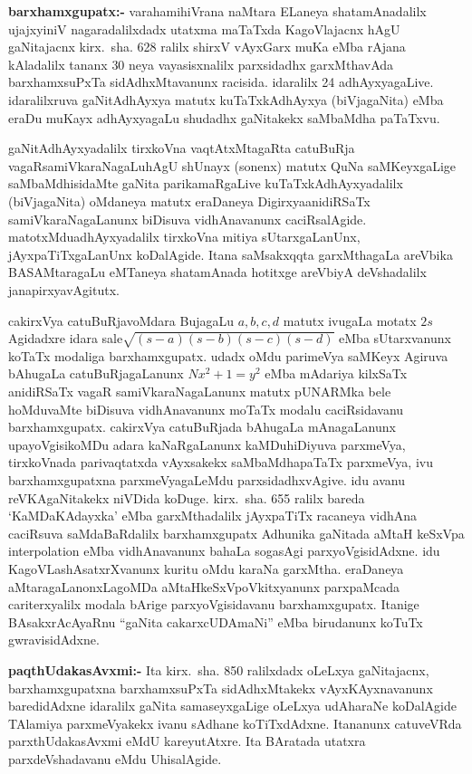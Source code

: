 \textbf{barxhamxgupatx:-} varahamihiVrana naMtara ELaneya shatamAnadalilx ujajxyiniV nagaradalilxdadx utatxma maTaTxda KagoVlajacnx hAgU gaNitajacnx kirx.~sha. {\rm 628} ralilx shirxV vAyxGarx muKa eMba rAjana kAladalilx tananx {\rm 30} neya vayasisxnalilx parxsidadhx garxMthavAda barxhamxsuPxTa sidAdhxMtavanunx racisida. idaralilx {\rm 24} adhAyxyagaLive. idaralilxruva gaNitAdhAyxya matutx kuTaTxkAdhAyxya (biVjagaNita) eMba eraDu muKayx adhAyxyagaLu shudadhx gaNitakekx saMbaMdha paTaTxvu.

gaNitAdhAyxyadalilx tirxkoVna vaqtAtxMtagaRta catuBuRja vagaRsamiVkaraNagaLu\break hAgU shUnayx (sonenx) matutx QuNa saMKeyxgaLige saMbaMdhisidaMte gaNita parikamaR\-gaLive kuTaTxkAdhAyxyadalilx (biVjagaNita) oMdaneya matutx eraDaneya Digirxya\break anidiRSaTx samiVkaraNagaLanunx biDisuva vidhAnavanunx caciRsalAgide. matotxMdu\break adhAyxyadalilx tirxkoVna mitiya sUtarxgaLanUnx, jAyxpaTiTxgaLanUnx koDalAgide. Itana saMsakxqqta garxMthagaLa areVbika BASAMtaragaLu eMTaneya shatamAnada hotitxge areVbiyA deVshadalilx janapirxyavAgitutx.

cakirxVya catuBuRjavoMdara BujagaLu $a, b, c, d$ matutx ivugaLa motatx $2s$  Agidadxre idara  sale$\sqrt{(s-a)(s-b)(s-c)(s-d)}$
eMba sUtarxvanunx koTaTx modaliga barxhamxgupatx. udadx oMdu parimeVya saMKeyx Agiruva bAhugaLa catuBuRjagaLanunx $Nx^{2}+1=y^{2}$ eMba mAdariya kilxSaTx anidiRSaTx vagaR samiVkaraNa\-gaLanunx matutx pUNARMka bele hoMduvaMte biDisuva vidhAnavanunx moTaTx modalu caciRsidavanu barxhamxgupatx. cakirxVya catuBuRjada bAhugaLa mAnagaLanunx upayoVgisikoMDu adara kaNaRgaLanunx kaMDuhiDiyuva parxmeVya, tirxkoVnada parivaqtatxda vAyxsakekx saMbaMdhapaTaTx parxmeVya, ivu barxhamxgupatxna parxmeVyagaLeMdu parxsidadhxvAgive. idu avanu reVKAgaNitakekx niVDida koDuge. kirx.~sha. {\rm 655} ralilx bareda `KaMDaKAdayxka' eMba garxMthadalilx jAyxpaTiTx racaneya vidhAna caciRsuva saMdaBaRdalilx barxhamxgupatx Adhunika gaNitada aMtaH keSxVpa {\rm interpolation} eMba vidhAnavanunx bahaLa sogasAgi parxyoVgisidAdxne. idu KagoVLashAsatxrXvanunx kuritu oMdu karaNa garxMtha. eraDaneya aMtaragaLanonxLagoMDa aMtaHkeSxVpoVkitxyanunx parxpaMcada cariterxyalilx modala bArige parxyoVgisidavanu barxhamxgupatx. Itanige BAsakxrAcAyaRnu ``gaNita cakarxcUDAmaNi'' eMba birudanunx koTuTx gwravisidAdxne. 

\textbf{paqthUdakasAvxmi:-} Ita kirx.~sha. {\rm 850} ralilxdadx oLeLxya gaNitajacnx, barxhamxgupatxna barxhamxsuPxTa sidAdhxMtakekx vAyxKAyxnavanunx baredidAdxne idaralilx gaNita samaseyxgaLige oLeLxya udAharaNe koDalAgide TAlamiya parxmeVyakekx ivanu sAdhane koTiTxdAdxne. Itananunx catuveVRda parxthUdakasAvxmi eMdU kareyutAtxre. Ita BAratada utatxra parxdeVshadavanu eMdu UhisalAgide.

